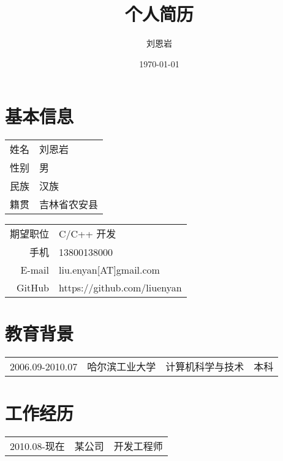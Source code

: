 \documentclass[a4paper, UTF8]{ctexart}
\title{个人简历}
\author{刘恩岩}
\date{\today}
\begin{document}
\section{基本信息}

\begin{tabular}{r@{：}l}
    姓名 & 刘恩岩 \\
    性别 & 男 \\
    民族 & 汉族 \\
    籍贯 & 吉林省农安县 \\
\end{tabular}
\begin{tabular}{r@{：}l}
    期望职位 & C/C++ 开发 \\
    手机 & 13800138000 \\
    E-mail & liu.enyan[AT]gmail.com  \\
    GitHub & https://github.com/liuenyan \\
\end{tabular}

\section{教育背景}

\begin{tabular}{cccc}
    2006.09-2010.07 & 哈尔滨工业大学 & 计算机科学与技术 & 本科 \\ 
\end{tabular}

\section{工作经历}
\begin{tabular}{ccc}
    2010.08-现在 & 某公司 & 开发工程师
\end{tabular}
\end{document}
